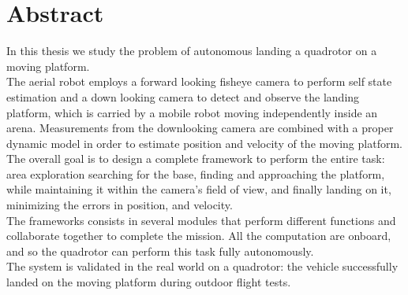 
 \setcounter{tocdepth}{2}
 \tableofcontents
 \cleardoublepage






\chapter*{Abstract}
In this thesis  we study the problem of autonomous landing a quadrotor on a moving platform.\\
The aerial robot employs a forward looking fisheye camera to perform self state estimation and a down looking camera
to detect and observe the landing platform, which is carried by a mobile robot moving independently inside an arena. Measurements from the downlooking camera are combined with a proper dynamic model in order to estimate position and velocity of the moving platform.\\
The overall goal is to design a complete framework to perform the entire task: area exploration searching for the base, finding and approaching the platform, while maintaining it within the camera's field of view, and finally landing on it, minimizing the errors in position, and velocity.\\
The frameworks consists in several modules that perform different functions and collaborate together to complete the mission. All the computation are onboard, and so the quadrotor can perform this task fully autonomously.\\
The system is validated in the real world on a quadrotor: the vehicle successfully landed on the moving platform during outdoor flight tests.
 \cleardoublepage



